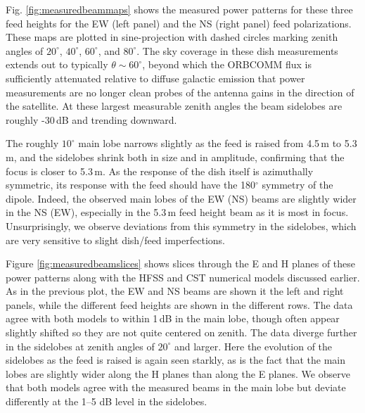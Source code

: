 \documentclass{emulateapj}
\begin{document}
Fig. \ref{fig:measuredbeammaps} shows the measured power patterns for these three feed heights for the EW (left panel) and the NS (right panel) feed polarizations. These maps are plotted in sine-projection with dashed circles marking zenith angles of $20^\circ$, $40^\circ$, $60^\circ$, and $80^\circ$. The sky coverage in these dish measurements extends out to typically $\theta\sim60^\circ$, beyond which the ORBCOMM flux is sufficiently attenuated relative to diffuse galactic emission that power measurements are no longer  clean probes of the antenna gains in the direction of the satellite. At these largest measurable zenith angles the beam sidelobes are roughly -30\,dB and trending downward. 

The roughly $10^\circ$ main lobe narrows slightly as the feed is raised from 4.5\,m to 5.3\,m, and the sidelobes shrink both in size and in amplitude, confirming that the focus is closer to 5.3\,m. As the response of the dish itself is azimuthally symmetric, its response with the feed should have the 180$^\circ$ symmetry of the dipole. Indeed, the observed main lobes of the EW (NS) beams are slightly wider in the NS (EW), especially in the 5.3\,m feed height beam as it is most in focus. Unsurprisingly, we observe deviations from this symmetry in the sidelobes, which are very sensitive to slight dish/feed imperfections. 

Figure \ref{fig:measuredbeamslices} shows slices through the E and H planes of these power patterns along with the HFSS and CST numerical models discussed earlier. As in the previous plot, the EW and NS beams are shown it the left and right panels, while the different feed heights are shown in the different rows. The data agree with both models to within 1\,dB in the main lobe, though often appear slightly shifted so they are not quite centered on zenith. The data diverge further in the sidelobes at zenith angles of $20^\circ$ and larger. Here the evolution of the sidelobes as the feed is raised is again seen starkly, as is the fact that the main lobes are slightly wider along the H planes than along the E planes. We observe that both models agree with the measured beams in the main lobe but deviate differently at the 1--5 dB level in the sidelobes. 
\end{document}
